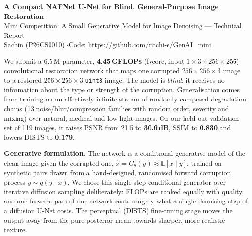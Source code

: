 \documentclass[10pt,a4paper]{article}
\makeatletter
\renewcommand\section{\@startsection{section}{1}{\z@}{6pt plus 2pt}{2pt}{\normalfont\large\bfseries}}
\makeatother
\begin{document}
\begin{center}
{\Large\bfseries A Compact NAFNet U-Net for Blind, General-Purpose Image Restoration}\\[3pt]
{\normalsize Mini Competition: A Small Generative Model for Image Denoising --- Technical Report}\\[2pt]
{\small Sachin (P26CS0010) \quad$\cdot$\quad Code: \url{https://github.com/ritchi-e/GenAI_mini}}
\end{center}

\vspace{-4pt}
\section{Summary}
We submit a 6.5\,M-parameter, \textbf{4.45\,GFLOPs} (fvcore, input $1{\times}3{\times}256{\times}256$) convolutional restoration network that maps one corrupted $256{\times}256{\times}3$ image to a restored $256{\times}256{\times}3$ \texttt{uint8} image. The model is \emph{blind}: it receives no information about the type or strength of the corruption. Generalisation comes from training on an effectively infinite stream of randomly composed degradation chains (13 noise/blur/compression families with random order, severity and mixing) over natural, medical and low-light images. On our held-out validation set of 119 images, it raises PSNR from 21.5 to \textbf{30.6\,dB}, SSIM to \textbf{0.830} and lowers DISTS to \textbf{0.179}.

\textbf{Generative formulation.} The network is a conditional generative model of the clean image given the corrupted one, $\hat{x} = G_\theta(y) \approx \mathbb{E}[x \mid y]$, trained on synthetic pairs drawn from a hand-designed, randomised forward corruption process $y \sim q(y\mid x)$. We chose this single-step conditional generator over iterative diffusion sampling deliberately: FLOPs are ranked equally with quality, and one forward pass of our network costs roughly what a single denoising step of a diffusion U-Net costs. The perceptual (DISTS) fine-tuning stage moves the output away from the pure posterior mean towards sharper, more realistic texture.
\end{document}
